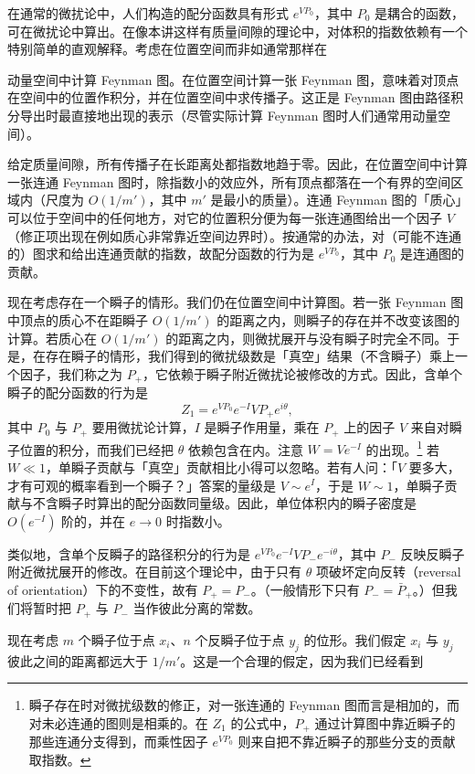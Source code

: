 在通常的微扰论中，人们构造的配分函数具有形式 $e^{VP_0}$，其中 $P_0$ 是耦合的函数，可在微扰论中算出。在像本讲这样有质量间隙的理论中，对体积的指数依赖有一个特别简单的直观解释。考虑在位置空间而非如通常那样在

动量空间中计算 Feynman 图。在位置空间计算一张 Feynman 图，意味着对顶点在空间中的位置作积分，并在位置空间中求传播子。这正是 Feynman 图由路径积分导出时最直接地出现的表示（尽管实际计算 Feynman 图时人们通常用动量空间）。

给定质量间隙，所有传播子在长距离处都指数地趋于零。因此，在位置空间中计算一张连通 Feynman 图时，除指数小的效应外，所有顶点都落在一个有界的空间区域内（尺度为 $O(1/m')$，其中 $m'$ 是最小的质量）。连通 Feynman 图的「质心」可以位于空间中的任何地方，对它的位置积分便为每一张连通图给出一个因子 $V$（修正项出现在例如质心非常靠近空间边界时）。按通常的办法，对（可能不连通的）图求和给出连通贡献的指数，故配分函数的行为是 $e^{VP_0}$，其中 $P_0$ 是连通图的贡献。

现在考虑存在一个瞬子的情形。我们仍在位置空间中计算图。若一张 Feynman 图中顶点的质心不在距瞬子 $O(1/m')$ 的距离之内，则瞬子的存在并不改变该图的计算。若质心在 $O(1/m')$ 的距离之内，则微扰展开与没有瞬子时完全不同。于是，在存在瞬子的情形，我们得到的微扰级数是「真空」结果（不含瞬子）乘上一个因子，我们称之为 $P_+$，它依赖于瞬子附近微扰论被修改的方式。因此，含单个瞬子的配分函数的行为是
\[
Z_1=e^{VP_0}e^{-I}VP_+e^{i\theta},
\]
其中 $P_0$ 与 $P_+$ 要用微扰论计算，$I$ 是瞬子作用量，乘在 $P_+$ 上的因子 $V$ 来自对瞬子位置的积分，而我们已经把 $\theta$ 依赖包含在内。注意 $W=Ve^{-I}$ 的出现。\footnote{瞬子存在时对微扰级数的修正，对一张连通的 Feynman 图而言是相加的，而对未必连通的图则是相乘的。在 $Z_1$ 的公式中，$P_+$ 通过计算图中靠近瞬子的那些连通分支得到，而乘性因子 $e^{VP_0}$ 则来自把不靠近瞬子的那些分支的贡献取指数。} 若 $W\ll1$，单瞬子贡献与「真空」贡献相比小得可以忽略。若有人问：「$V$ 要多大，才有可观的概率看到一个瞬子？」答案的量级是 $V\sim e^{I}$，于是 $W\sim1$，单瞬子贡献与不含瞬子时算出的配分函数同量级。因此，单位体积内的瞬子密度是 $O(e^{-I})$ 阶的，并在 $e\to0$ 时指数小。

类似地，含单个反瞬子的路径积分的行为是 $e^{VP_0}e^{-I}VP_-e^{-i\theta}$，其中 $P_-$ 反映反瞬子附近微扰展开的修改。在目前这个理论中，由于只有 $\theta$ 项破坏定向反转（reversal of orientation）下的不变性，故有 $P_+=P_-$。（一般情形下只有 $P_-=\bar P_+$。）但我们将暂时把 $P_+$ 与 $P_-$ 当作彼此分离的常数。

现在考虑 $m$ 个瞬子位于点 $x_i$、$n$ 个反瞬子位于点 $y_j$ 的位形。我们假定 $x_i$ 与 $y_j$ 彼此之间的距离都远大于 $1/m'$。这是一个合理的假定，因为我们已经看到

